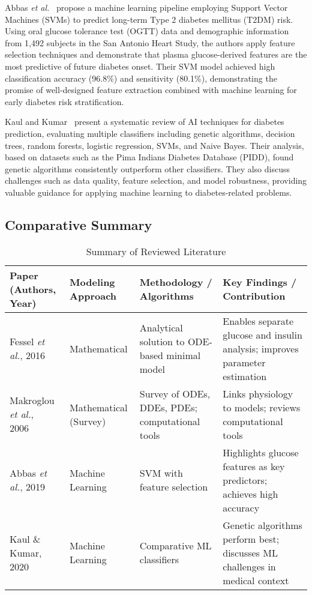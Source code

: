 \documentclass[conference]{IEEEtran}
\begin{document}
Abbas \textit{et al.}~\cite{abbas2019} propose a machine learning pipeline employing Support Vector Machines (SVMs) to predict long-term Type 2 diabetes mellitus (T2DM) risk. Using oral glucose tolerance test (OGTT) data and demographic information from 1,492 subjects in the San Antonio Heart Study, the authors apply feature selection techniques and demonstrate that plasma glucose-derived features are the most predictive of future diabetes onset. Their SVM model achieved high classification accuracy (96.8\%) and sensitivity (80.1\%), demonstrating the promise of well-designed feature extraction combined with machine learning for early diabetes risk stratification.

Kaul and Kumar~\cite{kaul2020} present a systematic review of AI techniques for diabetes prediction, evaluating multiple classifiers including genetic algorithms, decision trees, random forests, logistic regression, SVMs, and Naive Bayes. Their analysis, based on datasets such as the Pima Indians Diabetes Database (PIDD), found genetic algorithms consistently outperform other classifiers. They also discuss challenges such as data quality, feature selection, and model robustness, providing valuable guidance for applying machine learning to diabetes-related problems.

\subsection{Comparative Summary}

\begin{table}[htbp]
\caption{Summary of Reviewed Literature}
\centering
\begin{tabular}{|p{1.5cm}|p{1.5cm}|p{2.2cm}|p{1.6cm}|}
\hline
\textbf{Paper (Authors, Year)} & \textbf{Modeling Approach} & \textbf{Methodology / Algorithms} & \textbf{Key Findings / Contribution} \\
\hline
Fessel \textit{et al.}, 2016~\cite{fessel2016} & Mathematical & Analytical solution to ODE-based minimal model & Enables separate glucose and insulin analysis; improves parameter estimation \\
\hline
Makroglou \textit{et al.}, 2006~\cite{makroglou2006} & Mathematical (Survey) & Survey of ODEs, DDEs, PDEs; computational tools & Links physiology to models; reviews computational tools \\
\hline
Abbas \textit{et al.}, 2019~\cite{abbas2019} & Machine Learning & SVM with feature selection & Highlights glucose features as key predictors; achieves high accuracy \\
\hline
Kaul \& Kumar, 2020~\cite{kaul2020} & Machine Learning & Comparative ML classifiers & Genetic algorithms perform best; discusses ML challenges in medical context \\
\hline
\end{tabular}
\label{tab:literature_summary}
\end{table}
\end{document}
